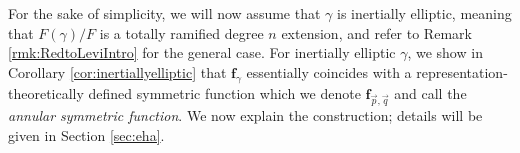 \documentclass{amsart}
\numberwithin{equation}{section}
\theoremstyle{definition}
\newcommand{\frs}{\mathbf{f}_{\vec{p},\vec{q}}}
\newcommand{\fpq}{\frs}
\newcommand{\fgamma}{\mathbf{f}_{\gamma}}
\begin{document}

For the sake of simplicity, we will now assume that $\gamma$ is inertially elliptic, meaning that $F(\gamma)/F$ is a totally ramified degree $n$ extension, and refer to Remark \ref{rmk:RedtoLeviIntro} for the general case.
For inertially elliptic $\gamma$, we show in Corollary \ref{cor:inertiallyelliptic} that $\fgamma$ essentially coincides with a representation-theoretically defined symmetric function which we denote $\fpq$ and call the {\em annular symmetric function}. We now explain the construction; details will be given in Section \ref{sec:eha}.
\end{document}
